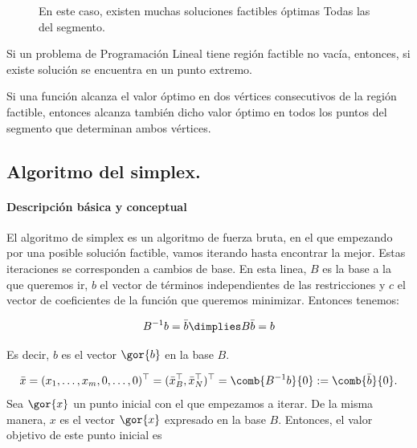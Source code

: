 \begin{figure}[h!]
\centering
{}
\caption{En este caso, existen muchas soluciones factibles óptimas Todas las del segmento.}
\end{figure}



\begin{theorem}
Si un problema de Programación Lineal tiene región factible no vacía, entonces, si existe solución se encuentra en un punto extremo.

Si una función alcanza el valor óptimo en dos vértices consecutivos de la región factible, entonces alcanza también dicho valor óptimo en todos los puntos del segmento que determinan ambos vértices.
\end{theorem}


\subsection{Algoritmo del simplex.}

\paragraph{Descripción básica y conceptual}
El algoritmo de simplex es un algoritmo de fuerza bruta, en el que empezando por una posible solución factible, vamos iterando hasta encontrar la mejor. Estas iteraciones se corresponden a cambios de base. En esta linea, $B$ es la base a la que queremos ir, $b$ el vector de términos independientes de las restricciones y $c$ el vector de coeficientes de la función que queremos minimizar. Entonces tenemos:

\[B^{-1}b = \bar{b} \dimplies B\bar{b} = b\]

Es decir, $b$ es el vector $\gor{b}$ en la base $B$.

\[\bar{x}=(x_1,\ldots,x_m,0,\ldots,0)^\top=(\bar{x}_B^\top,\bar{x}_N^\top)^\top=
\comb{B^{-1}b}{0}:=
\comb{\bar{b}}{0}.\]
Sea $\gor{x}$ un punto inicial con el que empezamos a iterar. De la misma manera, $x$ es el vector $\gor{x}$ expresado en la base $B$.
Entonces, el valor objetivo de este punto inicial es

